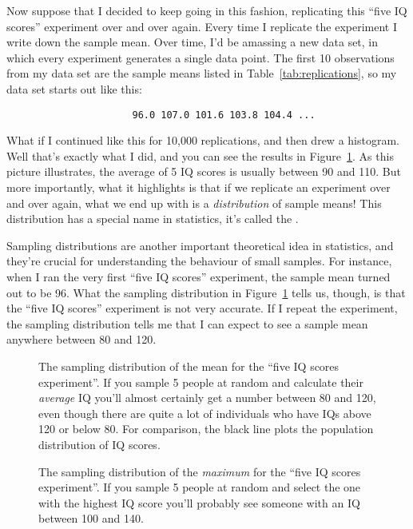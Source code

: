 Now suppose that I decided to keep going in this fashion, replicating this ``five IQ scores'' experiment over and over again. Every time I replicate the experiment I write down the sample mean. Over time, I'd be amassing a new data set, in which every experiment generates a single data point. The first 10 observations from my data set are the sample means listed in Table~\ref{tab:replications}, so my data set starts out like this:
\begin{verbatim}
                      96.0 107.0 101.6 103.8 104.4 ...
\end{verbatim}
What if I continued like this for 10,000 replications, and then drew a histogram. Well that's exactly what I did, and you can see the results in Figure~\ref{fig:sampdistmean}. As this picture illustrates, the average of 5 IQ scores is usually between 90 and 110. But more importantly, what it highlights is that if we replicate an experiment over and over again, what we end up with is a {\it distribution} of sample means! This distribution has a special name in statistics, it's called the . 

Sampling distributions are another important theoretical idea in statistics, and they're crucial for understanding the behaviour of small samples. For instance, when I ran the very first ``five IQ scores'' experiment, the sample mean turned out to be 96. What the sampling distribution in Figure~\ref{fig:sampdistmean} tells us, though, is that the ``five IQ scores'' experiment is not very accurate. If I repeat the experiment, the sampling distribution tells me that I can expect to see a sample mean anywhere between 80 and 120. 

\begin{figure}[!htb]
\begin{center}
\caption{The sampling distribution of the mean for the ``five IQ scores experiment''. If you sample 5 people at random and calculate their {\it average} IQ you'll almost certainly get a number between 80 and 120, even though there are quite a lot of individuals who have IQs above 120 or below 80. For comparison, the black line plots the population distribution of IQ scores.}
\label{fig:sampdistmean}
\HR
\end{center}
\end{figure}


\begin{figure}[!htb]
\begin{center}
\caption{The sampling distribution of the {\it maximum} for the ``five IQ scores experiment''. If you sample 5 people at random and select the one with the highest IQ score you'll probably see someone with an IQ between 100 and 140.}
\label{fig:sampdistmax}
\HR
\end{center}
\end{figure}


